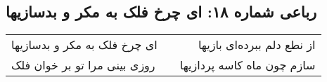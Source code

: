 \begin{center}
\section*{رباعی شماره ۱۸: ای چرخ فلک به مکر و بدسازیها}
\label{sec:0018}
\begin{longtable}{l p{0.5cm} r}
ای چرخ فلک به مکر و بدسازیها
&&
از نطع دلم ببرده‌ای بازیها
\\
روزی بینی مرا تو بر خوان فلک
&&
سازم چون ماه کاسه پردازیها
\\
\end{longtable}
\end{center}
